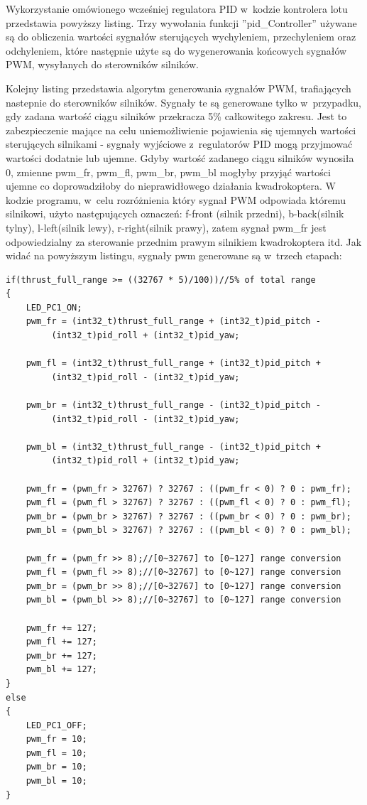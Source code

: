 \documentclass[11pt, twoside]{Thesis} %
\begin{document}
Wykorzystanie omówionego wcześniej regulatora PID w~kodzie kontrolera lotu przedstawia powyższy listing. Trzy wywołania funkcji ''pid\_Controller'' używane są do obliczenia wartości sygnałów sterujących wychyleniem, przechyleniem oraz odchyleniem, które następnie użyte są do wygenerowania końcowych sygnałów PWM, wysyłanych do sterowników silników. 


Kolejny listing przedstawia algorytm generowania sygnałów PWM, trafiających nastepnie do sterowników silników. Sygnały te są generowane tylko w~przypadku, gdy zadana wartość ciągu silników przekracza 5\% całkowitego zakresu. Jest to zabezpieczenie mające na celu uniemożliwienie pojawienia się ujemnych wartości sterujących silnikami - sygnały wyjściowe z~regulatorów PID mogą przyjmować wartości dodatnie lub ujemne. Gdyby wartość zadanego ciągu silników wynosiła 0, zmienne pwm\_fr, pwm\_fl, pwm\_br, pwm\_bl mogłyby przyjąć wartości ujemne co doprowadziłoby do nieprawidłowego działania kwadrokoptera. W kodzie programu, w~celu rozróżnienia który sygnał PWM odpowiada któremu silnikowi, użyto następujących oznaczeń: f-front (silnik przedni), b-back(silnik tylny), l-left(silnik lewy), r-right(silnik prawy), zatem sygnał pwm\_fr jest odpowiedzialny za sterowanie przednim prawym silnikiem kwadrokoptera itd. Jak widać na powyższym listingu, sygnały pwm generowane są w~trzech etapach:

\begin{lstlisting}
if(thrust_full_range >= ((32767 * 5)/100))//5% of total range
{
	LED_PC1_ON;
	pwm_fr = (int32_t)thrust_full_range + (int32_t)pid_pitch - 
		 (int32_t)pid_roll + (int32_t)pid_yaw;
	
	pwm_fl = (int32_t)thrust_full_range + (int32_t)pid_pitch + 
		 (int32_t)pid_roll - (int32_t)pid_yaw;
	
	pwm_br = (int32_t)thrust_full_range - (int32_t)pid_pitch - 
		 (int32_t)pid_roll - (int32_t)pid_yaw;
	
	pwm_bl = (int32_t)thrust_full_range - (int32_t)pid_pitch + 
		 (int32_t)pid_roll + (int32_t)pid_yaw;

	pwm_fr = (pwm_fr > 32767) ? 32767 : ((pwm_fr < 0) ? 0 : pwm_fr); 
	pwm_fl = (pwm_fl > 32767) ? 32767 : ((pwm_fl < 0) ? 0 : pwm_fl); 
	pwm_br = (pwm_br > 32767) ? 32767 : ((pwm_br < 0) ? 0 : pwm_br);
	pwm_bl = (pwm_bl > 32767) ? 32767 : ((pwm_bl < 0) ? 0 : pwm_bl);

	pwm_fr = (pwm_fr >> 8);//[0~32767] to [0~127] range conversion
	pwm_fl = (pwm_fl >> 8);//[0~32767] to [0~127] range conversion
	pwm_br = (pwm_br >> 8);//[0~32767] to [0~127] range conversion
	pwm_bl = (pwm_bl >> 8);//[0~32767] to [0~127] range conversion

	pwm_fr += 127;
	pwm_fl += 127;
	pwm_br += 127;
	pwm_bl += 127;
}
else
{
	LED_PC1_OFF;
	pwm_fr = 10;
	pwm_fl = 10;
	pwm_br = 10;
	pwm_bl = 10;
}
\end{lstlisting}
\end{document}
